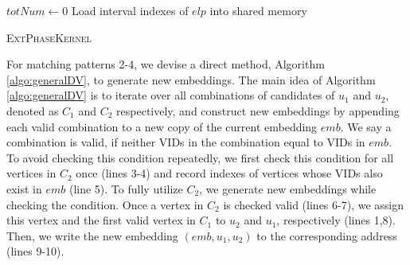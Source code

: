 \begin{algorithm}
$totNum \leftarrow 0$\;
Load interval indexes of $elp$ into shared memory\;

\caption{\textsc{ExtPhaseKernel}}
\label{algo:extphase}
\end{algorithm}

For matching patterns 2-4, we devise a direct method, Algorithm \ref{algo:generalDV}, to generate new embeddings. The main idea of Algorithm \ref{algo:generalDV} is to iterate over all combinations of candidates of $u_{1}$ and $u_{2}$, denoted as $C_1$ and $C_2$ respectively, and construct new embeddings by appending each valid combination to a new copy of the current embedding $emb$. We say a combination is valid, if neither VIDs in the combination equal to VIDs in $emb$. To avoid checking this condition repeatedly, we first check this condition for all vertices in $C_2$ once (lines 3-4) and record indexes of vertices whose VIDs also exist in $emb$ (line 5). To fully utilize $C_2$, we generate new embeddings while checking the condition. Once a vertex in $C_2$ is checked valid (lines 6-7), we assign this vertex and the first valid vertex in $C_1$ to $u_2$ and $u_1$, respectively (lines 1,8). Then, we write the new embedding $(emb,u_1,u_2)$ to the corresponding address (lines 9-10).

